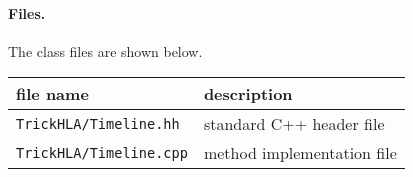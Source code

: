 \paragraph{Files.}
The class files are shown below.

{
  \scriptsize
  \begin{tabular}{|l|l|}
    \hline
    file name & description \\
    \hline \hline
    {\tt TrickHLA/Timeline.hh}
    & standard C++ header file
    \\ \hline
    {\tt TrickHLA/Timeline.cpp}
    & method implementation file
    \\ \hline
  \end{tabular}
}
